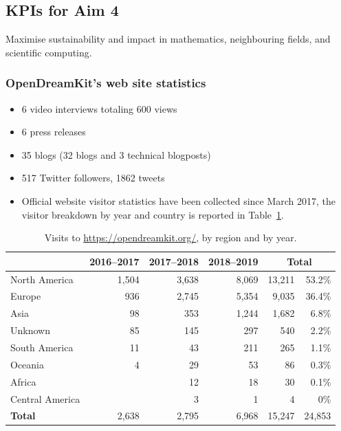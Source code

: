 \subsection{KPIs for Aim 4}

\begin{aim}
  Maximise sustainability and impact in mathematics, neighbouring
  fields, and scientific computing.
\end{aim}

\subsubsection{OpenDreamKit's web site statistics}

\begin{itemize}
\item 6 video interviews totaling 600 views %
\item 6 press releases
\item 35 blogs (32 blogs and 3 technical blogposts)
\item 517 Twitter followers, 1862 tweets
\item Official website visitor statistics have been collected since
  March 2017, the visitor breakdown by year and country is reported in
  Table~\ref{tab:byregion}.
\end{itemize}

\begin{table}[h]
  \centering
  \begin{tabular}{l r r r r r}
    & {\bf 2016--2017} & {\bf 2017--2018} & {\bf 2018--2019} & \multicolumn{2}{c}{\bf Total}\\
    \hline
    North America   & 1,504 & 3,638 & 8,069 & 13,211 & 53.2\%\\
    Europe          &   936 & 2,745 & 5,354 &  9,035 & 36.4\%\\
    Asia            &    98 &   353 & 1,244 &  1,682 &  6.8\%\\
    Unknown         &    85 &   145 &   297 &    540 &  2.2\%\\
    South America   &    11 &    43 &   211 &    265 &  1.1\%\\
    Oceania         &     4 &    29 &    53 &     86 &  0.3\%\\
    Africa          &       &    12 &    18 &     30 &  0.1\%\\
    Central America &       &     3 &     1 &      4 &  0\%\\
    \hline
    {\bf Total}  & 2,638 & 2,795 & 6,968 & 15,247 & 24,853
  \end{tabular}
  \caption{Visits to \url{https://opendreamkit.org/}, by region and by year.}
  \label{tab:byregion}
\end{table}

